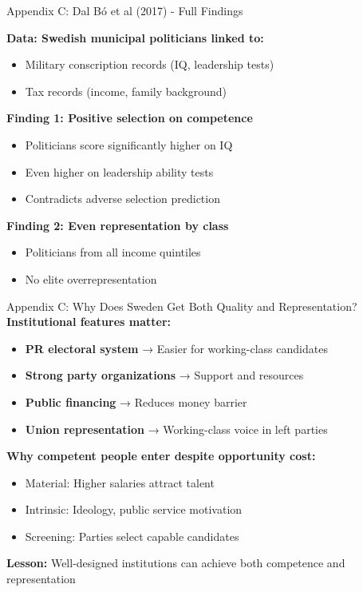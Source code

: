 \documentclass[10pt]{beamer}
\begin{document}
\begin{frame}[label=dal-bo]{Appendix C: Dal Bó et al (2017) - Full Findings}
\hypertarget{dal-bo}{}

\textbf{Data: Swedish municipal politicians linked to:}
\begin{itemize}
\item Military conscription records (IQ, leadership tests)
\item Tax records (income, family background)
\end{itemize}


\textbf{Finding 1: Positive selection on competence}
\begin{itemize}
\item Politicians score significantly higher on IQ
\item Even higher on leadership ability tests
\item Contradicts adverse selection prediction
\end{itemize}


\textbf{Finding 2: Even representation by class}
\begin{itemize}
\item Politicians from all income quintiles
\item No elite overrepresentation
\end{itemize}


\small{\hyperlink{dal-bo-main}{}}
\end{frame}

\begin{frame}{Appendix C: Why Does Sweden Get Both Quality and Representation?}
\textbf{Institutional features matter:}

\begin{itemize}
\item \textbf{PR electoral system} → Easier for working-class candidates
\item \textbf{Strong party organizations} → Support and resources
\item \textbf{Public financing} → Reduces money barrier
\item \textbf{Union representation} → Working-class voice in left parties
\end{itemize}


\textbf{Why competent people enter despite opportunity cost:}
\begin{itemize}
\item Material: Higher salaries attract talent
\item Intrinsic: Ideology, public service motivation
\item Screening: Parties select capable candidates
\end{itemize}


\textbf{Lesson:} Well-designed institutions can achieve both competence and representation


\small{\hyperlink{dal-bo-main}{}}
\end{frame}
\end{document}
